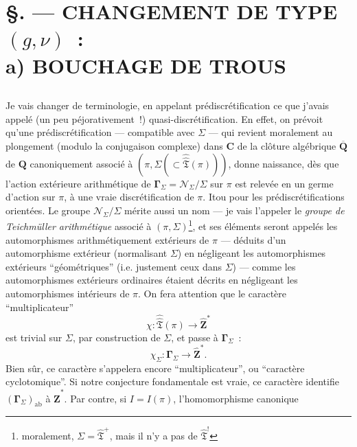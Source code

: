 

\chapter*{\S {}. --- CHANGEMENT DE TYPE $(g,\nu)$~: \\ a) BOUCHAGE DE TROUS}\thispagestyle{empty}
\label{sec:27}
\section*{}

Je vais changer de terminologie, en appelant prédiscrétification ce que j'avais appelé (un peu péjorativement~!) quasi-discrétification. En effet, on prévoit qu'une prédiscrétification --- compatible avec $\Sigma$ --- qui revient moralement au plongement (modulo la conjugaison complexe) dans $\mathbf{C}$ de la clôture algébrique $\overline{\mathbf{Q}}$ de $\mathbf{Q}$ canoniquement associé à $(\pi,\Sigma (\subset\hat{\hat{\mathfrak{T}}}(\pi)))$, donne naissance, dès que l'action extérieure arithmétique de $\boldsymbol{\Gamma}_\Sigma= \mathcal{N}_\Sigma/\Sigma$ sur $\pi$ est relevée en un germe d'action sur $\pi$, à une vraie discrétification de $\pi$. Itou pour les prédiscrétifications orientées. Le groupe $\mathcal{N}_\Sigma/\Sigma$ mérite aussi un nom --- je vais l'appeler le \emph{groupe de Teichmüller arithmétique} associé à $(\pi,\Sigma)$\footnote{moralement, $\Sigma=\hat{\mathfrak{T}}^+$, mais il n'y a pas de $\hat{\mathfrak{T}}^!$}, et ses éléments seront appelés les automorphismes arithmétiquement extérieurs de $\pi$ --- déduits d'un automorphisme extérieur (normalisant $\Sigma$) en négligeant les automorphismes extérieurs ``géométriques'' (i.e. justement ceux dans $\Sigma$) --- comme les automorphismes extérieurs ordinaires étaient décrits en négligeant les automorphismes intérieurs de $\pi$. On fera attention que le caractère ``multiplicateur''
$$
\chi:\hat{\hat{\mathfrak{T}}}(\pi)\to \hat{\mathbf{Z}}^*
$$
est trivial sur $\Sigma$, par construction de $\Sigma$, et passe à $\boldsymbol{\Gamma}_\Sigma$~:
$$
\chi_{\Sigma}:\boldsymbol{\Gamma}_\Sigma \to \hat{\mathbf{Z}}^*.
$$
Bien sûr, ce caractère s'appelera encore ``multiplicateur'', ou ``caractère cyclotomique''. Si notre conjecture fondamentale est vraie, %
ce caractère identifie $(\boldsymbol{\Gamma}_\Sigma)_{\text{ab}}$ à $\hat{\mathbf{Z}}^*$. Par contre, si $I=I(\pi)$, l'homomorphisme canonique
